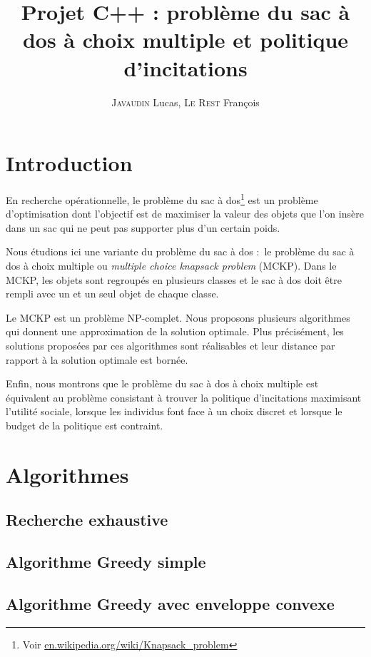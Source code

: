 \documentclass{article}
\title{Projet C++ : problème du sac à dos à choix multiple et politique d'incitations}
\author{\textsc{Javaudin} Lucas, \textsc{Le Rest} François}
\begin{document}
\maketitle

\tableofcontents

\newpage

\section{Introduction}

En recherche opérationnelle, le problème du sac à dos\footnote{Voir \url{en.wikipedia.org/wiki/Knapsack_problem}} est un problème d'optimisation dont l'objectif est de maximiser la valeur des objets que l'on insère dans un sac qui ne peut pas supporter plus d'un certain poids.

Nous étudions ici une variante du problème du sac à dos : le problème du sac à dos à choix multiple ou \textit{multiple choice knapsack problem} (MCKP).
Dans le MCKP, les objets sont regroupés en plusieurs classes et le sac à dos doit être rempli avec un et un seul objet de chaque classe.

Le MCKP est un problème NP-complet.
Nous proposons plusieurs algorithmes qui donnent une approximation de la solution optimale.
Plus précisément, les solutions proposées par ces algorithmes sont réalisables et leur distance par rapport à la solution optimale est bornée.

Enfin, nous montrons que le problème du sac à dos à choix multiple est équivalent au problème consistant à trouver la politique d'incitations maximisant l'utilité sociale, lorsque les individus font face à un choix discret et lorsque le budget de la politique est contraint.

\section{Algorithmes}

\subsection{Recherche exhaustive}

\subsection{Algorithme Greedy simple}

\subsection{Algorithme Greedy avec enveloppe convexe}
\end{document}
